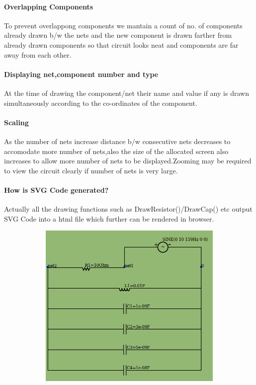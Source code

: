 \documentclass[12pt]{extarticle}
\begin{document}
\paragraph{Overlapping Components}
To prevent overlappong components we mantain a count of no. of components already drawn b/w the nets and the new component is drawn farther from already drawn components so that circuit looks neat and components are far away from each other. 

\paragraph{Displaying net,component number and type}
At the time of drawing the component/net their name and value if any is drawn simultaneously according to the co-ordinates of the component.

\paragraph{Scaling}
As the number of nets increase distance b/w consecutive nets decreases to accomodate more number of nets,also the size of the allocated screen also increases to allow more number of nets to be displayed.Zooming may be required to view the circuit clearly if number of nets is very large. 

\paragraph{How is SVG Code generated?}
Actually all the drawing functions such as DrawResistor()/DrawCap() etc output SVG Code into a html file which further can be rendered in browser.
\begin{center}
\includegraphics[width=14cm, height=8cm]{Top}
\end{center}
\end{document}
